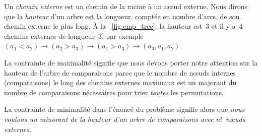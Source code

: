 Un \emph{chemin externe} est un
chemin de la racine à un n{\oe}ud externe. Nous dirons que la
\emph{hauteur} d'un arbre est la
longueur, comptée en nombre d'arcs, de son chemin externe le plus
long. À la \fig~\ref{fig:cmp_tree}, la hauteur est~\(3\) et il y
a~\(4\) chemins externes de longueur~\(3\), par exemple \((a_1 < a_2)
\rightarrow (a_2 > a_3) \rightarrow (a_1 > a_3) \rightarrow
(a_3,a_1,a_2)\).

La contrainte de maximalité signifie que nous devons porter notre
attention sur la hauteur de l'arbre de comparaisons parce que le
nombre de n{\oe}uds internes (comparaisons) le long des chemins
externes maximaux est un majorant du nombre de comparaisons
nécessaires pour trier \emph{toutes} les
permutations.

La contrainte de minimalité dans l'énoncé du problème signifie alors
que \emph{nous voulons un minorant de la hauteur d'un arbre de
  comparaisons avec \(n!\)~n{\oe}uds externes}.

